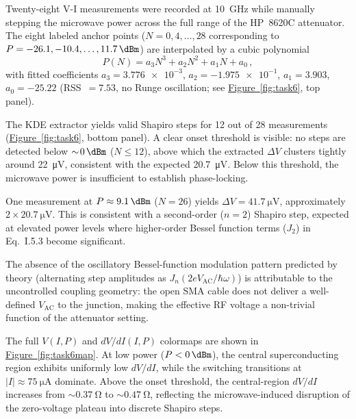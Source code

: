 \documentclass[12pt,a4paper]{article}
\begin{document}
Twenty-eight V-I measurements were recorded at \SI{10}{\giga\hertz} while manually
stepping the microwave power across the full range of the HP~8620C attenuator. The
eight labeled anchor points ($N = 0, 4, \ldots, 28$ corresponding to
$P = -26.1, -10.4, \ldots, \SI{11.7}{\dBm}$) are interpolated by a cubic polynomial
\begin{equation}
    P(N) = a_3 N^3 + a_2 N^2 + a_1 N + a_0\,,
    \label{eq:power_poly}
\end{equation}
with fitted coefficients $a_3 = \num{3.776e-3}$, $a_2 = \num{-1.975e-1}$,
$a_1 = \num{3.903}$, $a_0 = \num{-25.22}$ (RSS~$= 7.53$, no Runge oscillation; see
\hyperref[fig:task6]{Figure~\ref*{fig:task6}}, top panel).

The KDE extractor yields valid Shapiro steps for 12 out of 28 measurements
(\hyperref[fig:task6]{Figure~\ref*{fig:task6}}, bottom panel). A clear onset
threshold is visible: no steps are detected below $\sim\!\SI{0}{\dBm}$
($N \leq 12$), above which the extracted $\Delta V$ clusters tightly around
\SI{22}{\micro\volt}, consistent with the expected \SI{20.7}{\micro\volt}. Below
this threshold, the microwave power is insufficient to establish phase-locking.

One measurement at $P \approx \SI{9.1}{\dBm}$ ($N = 26$) yields
$\Delta V = \SI{41.7}{\micro\volt}$, approximately $2 \times \SI{20.7}{\micro\volt}$.
This is consistent with a second-order ($n = 2$) Shapiro step, expected at elevated
power levels where higher-order Bessel function terms ($J_2$) in Eq.~I.5.3 become
significant.

The absence of the oscillatory Bessel-function modulation pattern predicted by
theory (alternating step amplitudes as $J_n(2eV_\mathrm{AC}/\hbar\omega)$) is
attributable to the uncontrolled coupling geometry: the open SMA cable does not
deliver a well-defined $V_\mathrm{AC}$ to the junction, making the effective RF
voltage a non-trivial function of the attenuator setting.

The full $V(I, P)$ and $dV/dI(I, P)$ colormaps are shown in
\hyperref[fig:task6map]{Figure~\ref*{fig:task6map}}. At low power
($P < \SI{0}{\dBm}$), the central superconducting region exhibits uniformly low
$dV/dI$, while the switching transitions at $|I| \approx \SI{75}{\micro\ampere}$
dominate. Above the onset threshold, the central-region $dV/dI$ increases from
$\sim\!\SI{0.37}{\ohm}$ to $\sim\!\SI{0.47}{\ohm}$, reflecting the microwave-induced disruption
of the zero-voltage plateau into discrete Shapiro steps.
\end{document}
